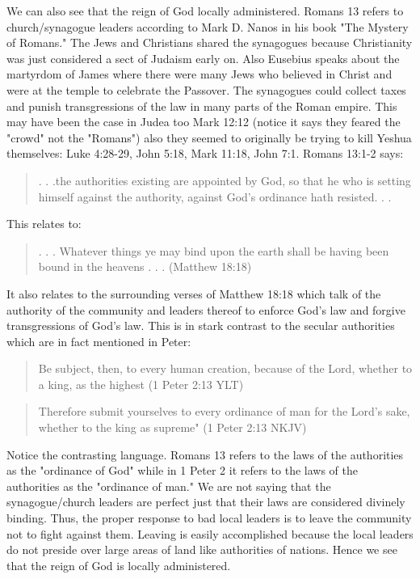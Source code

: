 \documentclass[11pt]{article}
\begin{document}
We can also see that the reign of God locally administered. Romans 13 refers to church/synagogue leaders according to Mark D. Nanos in his book "The Mystery of Romans." The Jews and Christians shared the synagogues because Christianity was just considered a sect of Judaism early on. Also Eusebius speaks about the martyrdom of James where there were many Jews who believed in Christ and were at the temple to celebrate the Passover. \cite{martyrdom of james} The synagogues could collect taxes and punish transgressions of the law in many parts of the Roman empire.%
This may have been the case in Judea too Mark 12:12 (notice it says they feared the "crowd" not the "Romans") also they seemed to originally be trying to kill Yeshua themselves: Luke 4:28-29, John 5:18, Mark 11:18, John 7:1. Romans 13:1-2 says:
\begin{quote}
. . .the authorities existing are appointed by God, so that he who is setting himself against the authority, against God's ordinance hath resisted. . .
\end{quote} 
This relates to:
\begin{quote}
. . . Whatever things ye may bind upon the earth shall be having been bound in the heavens . . . (Matthew 18:18)
\end{quote}
It also relates to the surrounding verses of Matthew 18:18 which talk of the authority of the community and leaders thereof to enforce God's law and forgive transgressions of God's law. This is in stark contrast to the secular authorities which are in fact mentioned in Peter:
\begin{quote}
Be subject, then, to every human creation, because of the Lord, whether to a king, as the highest (1 Peter 2:13 YLT)
\end{quote} 
\begin{quote}
Therefore submit yourselves to every ordinance of man for the Lord’s sake, whether to the king as supreme" (1 Peter 2:13 NKJV)
\end{quote}
Notice the contrasting language. Romans 13 refers to the laws of the authorities as the "ordinance of God" while in 1 Peter 2 it refers to the laws of the authorities as the "ordinance of man." We are not saying that the synagogue/church leaders are perfect just that their laws are considered divinely binding. Thus, the proper response to bad local leaders is to leave the community not to fight against them. Leaving is easily accomplished because the local leaders do not preside over large areas of land like authorities of nations. Hence we see that the reign of God is locally administered.
\end{document}
